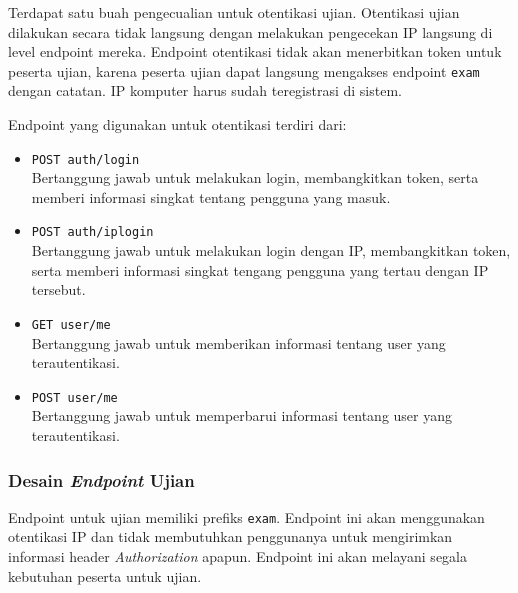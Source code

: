     Terdapat satu buah pengecualian untuk otentikasi ujian. Otentikasi ujian
    dilakukan secara tidak langsung dengan melakukan pengecekan IP langsung di
    level endpoint mereka. Endpoint otentikasi tidak akan menerbitkan token
    untuk peserta ujian, karena peserta ujian dapat langsung mengakses endpoint
    \texttt{exam} dengan catatan. IP komputer harus sudah teregistrasi di
    sistem.
    
    Endpoint yang digunakan untuk otentikasi terdiri dari:
    \begin{itemize}
        \item \texttt{POST auth/login} \\
            Bertanggung jawab untuk melakukan login, membangkitkan token, serta
            memberi informasi singkat tentang pengguna yang masuk.
        
        \item \texttt{POST auth/iplogin} \\
            Bertanggung jawab untuk melakukan login dengan IP, membangkitkan
            token, serta memberi informasi singkat tengang pengguna yang tertau
            dengan IP tersebut.
            
        \item \texttt{GET user/me} \\
            Bertanggung jawab untuk memberikan informasi tentang user yang
            terautentikasi.
            
        \item \texttt{POST user/me} \\
            Bertanggung jawab untuk memperbarui informasi tentang user yang
            terautentikasi.
    \end{itemize}
    
\subsubsection{Desain \textit{Endpoint} Ujian} Endpoint untuk ujian memiliki
    prefiks \texttt{exam}. Endpoint ini akan menggunakan otentikasi IP dan tidak
    membutuhkan penggunanya untuk mengirimkan informasi header
    \textit{Authorization} apapun. Endpoint ini akan melayani segala kebutuhan
    peserta untuk ujian.
    
